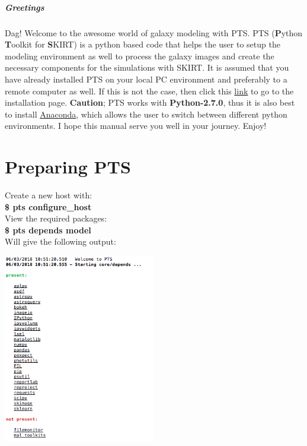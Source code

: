 \documentclass[15pt,a4paper,oneside,openright]{report}
\begin{document}
\subsubsection{Greetings}

\vspace{10mm}

Dag! Welcome to the awesome world of galaxy modeling with PTS. PTS (\textbf{P}ython \textbf{T}oolkit for \textbf{S}KIRT) 
is a python based code that helps the user to setup the modeling environment as well to process 
the galaxy images and create the necessary components for the simulations with SKIRT. It is assumed that you have already installed PTS on your local PC environment and preferably to a remote computer as well. If this is not the case, then click this \href{http://www.skirt.ugent.be/pts/index.html}{link} to go to the installation page. \textbf{Caution}; PTS works with \textbf{Python-2.7.0}, thus it is also best to install \href{https://anaconda.org/anaconda/python}{Anaconda}, which allows the user to switch between different python environments. I hope this manual serve you well in your journey. Enjoy!

\tableofcontents

\part{Preparing PTS}

Create a new host with:\\

\textbf{\$ pts configure\_host}\\

View the required packages:\\

\textbf{\$ pts depends model}\\

Will give the following output:

\begin{center}
\includegraphics[width=0.5\textwidth]{figures/depends.png}
\end{center}
\end{document}
